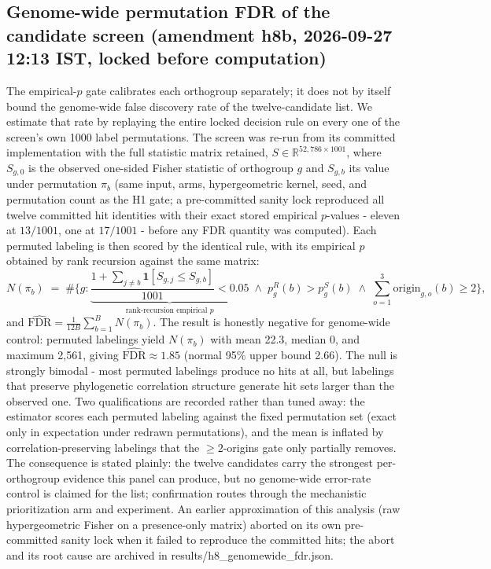 \documentclass[12pt,a4paper]{article}
\begin{document}
\subsection{Genome-wide permutation FDR of the candidate screen (amendment h8b, 2026-09-27 12:13 IST, locked before computation)}
The empirical-$p$ gate calibrates each orthogroup separately; it does not by itself bound the genome-wide false discovery rate of the twelve-candidate list. We estimate that rate by replaying the entire locked decision rule on every one of the screen's own 1000 label permutations. The screen was re-run from its committed implementation with the full statistic matrix retained, $S \in \mathbb{R}^{52{,}786 \times 1001}$, where $S_{g,0}$ is the observed one-sided Fisher statistic of orthogroup $g$ and $S_{g,b}$ its value under permutation $\pi_b$ (same input, arms, hypergeometric kernel, seed, and permutation count as the H1 gate; a pre-committed sanity lock reproduced all twelve committed hit identities with their exact stored empirical $p$-values - eleven at $13/1001$, one at $17/1001$ - before any FDR quantity was computed). Each permuted labeling is then scored by the identical rule, with its empirical $p$ obtained by rank recursion against the same matrix:
\begin{equation}
N(\pi_b) \;=\; \#\Big\{ g : \underbrace{\frac{1 + \sum_{j \neq b} \mathbf{1}\!\left[ S_{g,j} \le S_{g,b} \right]}{1001} < 0.05}_{\text{rank-recursion empirical } p} \;\wedge\; p^{R}_{g}(b) > p^{S}_{g}(b) \;\wedge\; \sum_{o=1}^{3} \mathrm{origin}_{g,o}(b) \ge 2 \Big\},
\end{equation}
and $\widehat{\mathrm{FDR}} = \tfrac{1}{12 B} \sum_{b=1}^{B} N(\pi_b)$. The result is honestly negative for genome-wide control: permuted labelings yield $N(\pi_b)$ with mean 22.3, median 0, and maximum 2{,}561, giving $\widehat{\mathrm{FDR}} \approx 1.85$ (normal 95\% upper bound 2.66). The null is strongly bimodal - most permuted labelings produce no hits at all, but labelings that preserve phylogenetic correlation structure generate hit sets larger than the observed one. Two qualifications are recorded rather than tuned away: the estimator scores each permuted labeling against the fixed permutation set (exact only in expectation under redrawn permutations), and the mean is inflated by correlation-preserving labelings that the $\ge 2$-origins gate only partially removes. The consequence is stated plainly: the twelve candidates carry the strongest per-orthogroup evidence this panel can produce, but no genome-wide error-rate control is claimed for the list; confirmation routes through the mechanistic prioritization arm and experiment. An earlier approximation of this analysis (raw hypergeometric Fisher on a presence-only matrix) aborted on its own pre-committed sanity lock when it failed to reproduce the committed hits; the abort and its root cause are archived in results/h8\_genomewide\_fdr.json.
\end{document}
